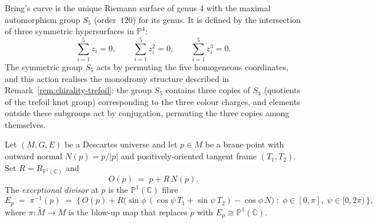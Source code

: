 \begin{remark}
\label{rem:brings-curve}
Bring's curve is the unique Riemann surface of genus $4$ with the maximal
automorphism group $S_5$ (order~$120$) for its genus.  It is defined by
the intersection of three symmetric hypersurfaces in $\mathbb{P}^4$:
\[
  \sum_{i=1}^{5} z_i = 0,
  \qquad
  \sum_{i=1}^{5} z_i^2 = 0,
  \qquad
  \sum_{i=1}^{5} z_i^3 = 0.
\]
The symmetric group $S_5$ acts by permuting the five homogeneous coordinates,
and this action realises the monodromy structure described in
Remark~\ref{rem:chirality-trefoil}: the group $S_5$ contains three copies of
$S_3$ (quotients of the trefoil knot group) corresponding to the three
colour charges, and elements outside these subgroups act by conjugation,
permuting the three copies among themselves.
\end{remark}


\begin{definition}
\label{def:exceptional-divisor}
Let $(M, G, E)$ be a Descartes universe and let $p \in M$ be a brane point
with outward normal $N(p) = p/\lvert p\rvert$ and positively-oriented
tangent frame $(T_1, T_2)$.  Set $R = R_{\mathbb{P}^1(\mathbb{C})}$ and
\[
  O(p) \;=\; p + R\,N(p).
\]
The \emph{exceptional divisor} at $p$ is the $\mathbb{P}^1(\mathbb{C})$ fibre
\[
  E_p \;=\; \pi^{-1}(p)
  \;=\;
  \bigl\{\,
    O(p) + R\bigl(\sin\phi\,(\cos\psi\,T_1 + \sin\psi\,T_2) - \cos\phi\,N\bigr)
    \;:\;
    \phi \in [0,\pi],\; \psi \in [0,2\pi)
  \,\bigr\},
\]
where $\pi\colon \widetilde{M} \to M$ is the blow-up map that replaces $p$
with $E_p \cong \mathbb{P}^1(\mathbb{C})$.
\end{definition}

